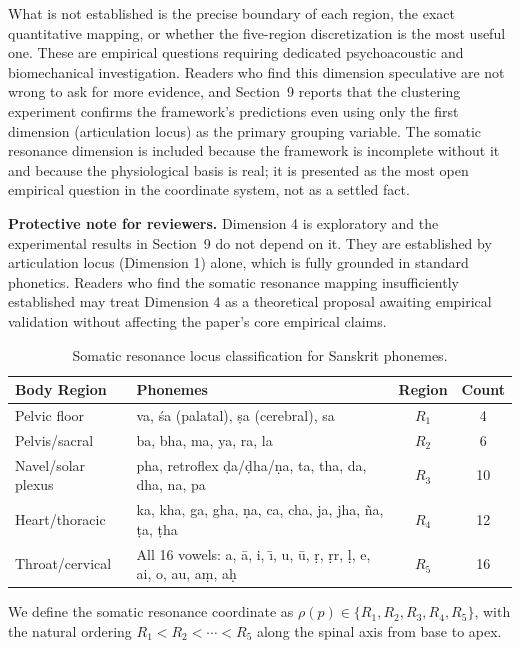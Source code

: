 \documentclass[12pt]{article}
\begin{document}
What is not established is the precise boundary of each region, the exact quantitative mapping, or whether the five-region discretization is the most useful one. These are empirical questions requiring dedicated psychoacoustic and biomechanical investigation. Readers who find this dimension speculative are not wrong to ask for more evidence, and Section~9 reports that the clustering experiment confirms the framework's predictions even using only the first dimension (articulation locus) as the primary grouping variable. The somatic resonance dimension is included because the framework is incomplete without it and because the physiological basis is real; it is presented as the most open empirical question in the coordinate system, not as a settled fact.

\textbf{Protective note for reviewers.} Dimension 4 is exploratory and the experimental results in Section~9 do not depend on it. They are established by articulation locus (Dimension 1) alone, which is fully grounded in standard phonetics. Readers who find the somatic resonance mapping insufficiently established may treat Dimension 4 as a theoretical proposal awaiting empirical validation without affecting the paper's core empirical claims.

\begin{table}[htbp]
\centering
\renewcommand{\arraystretch}{1.3}
\begin{tabular}{llcc}
\toprule
\textbf{Body Region} & \textbf{Phonemes} & \textbf{Region} & \textbf{Count} \\
\midrule
Pelvic floor & va, \'{s}a (palatal), \d{s}a (cerebral), sa & $R_1$ & 4 \\
Pelvis/sacral & ba, bha, ma, ya, ra, la & $R_2$ & 6 \\
Navel/solar plexus & pha, retroflex \d{d}a/\d{d}ha/\d{n}a, ta, tha, da, dha, na, pa & $R_3$ & 10 \\
Heart/thoracic & ka, kha, ga, gha, \d{n}a, ca, cha, ja, jha, \~{n}a, \d{t}a, \d{t}ha & $R_4$ & 12 \\
Throat/cervical & All 16 vowels: a, \={a}, i, \={\i}, u, \={u}, \d{r}, \d{r}r, \d{l}, e, ai, o, au, a\d{m}, a\d{h} & $R_5$ & 16 \\
\bottomrule
\end{tabular}
\caption{Somatic resonance locus classification for Sanskrit phonemes.}
\end{table}

We define the somatic resonance coordinate as $\rho(p) \in \{R_1, R_2, R_3, R_4, R_5\}$, with the natural ordering $R_1 < R_2 < \cdots < R_5$ along the spinal axis from base to apex.
\end{document}
